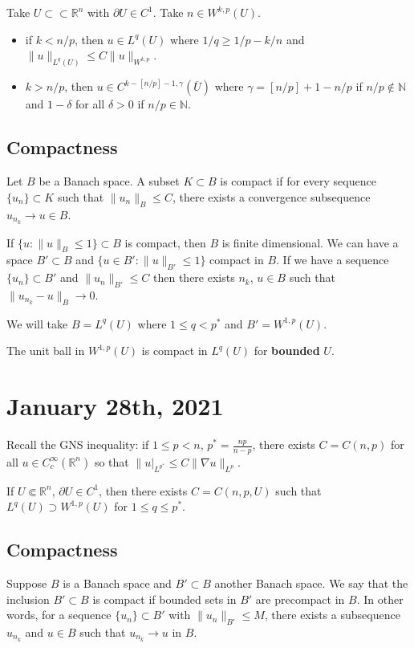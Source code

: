 \documentclass[12pt]{scrartcl}
\newcommand{\N}{\mathbb{N}}
\newcommand{\R}{\mathbb{R}}
\newcommand{\<}{\langle}
\renewcommand{\>}{\rangle}
\let \grad \nabla
\begin{document}
\begin{thm}
Take $U \subset \subset \R^n$ with $\partial U \in C^1$.  Take $n \in W^{k, p}(U)$.  
\begin{itemize}
\item if $k < n/p$, then $u \in L^q(U)$ where $1/q \ge 1/p - k/n$ and $\|u\|_{L^q(U)} \le C \|u\|_{W^{k, p}}$.
\item $k > n/p$, then $u \in C^{k - [n/p] - 1, \gamma}(\overline{U})$ where $\gamma = [n/p] + 1 - n/p$ if $n/p \not \in \N$ and $1 - \delta$ for all $\delta > 0$ if $n/p \in \N$.
\end{itemize}
\end{thm}
\subsection{Compactness}
\begin{definition} Let $B$ be a Banach space.  A subset $K \subset B$ is compact if for every sequence $\{u_n\} \subset K$ such that $\|u_n\|_B \le C$, there exists a convergence subsequence $u_{n_k} \to u \in B$.
\end{definition}
\begin{remark} If $\{u : \|u\|_B \le 1\} \subset B$ is compact, then $B$ is finite dimensional.   We can have a space $B' \subset B$ and $\{u \in B' : \|u\|_{B'} \le 1\}$ compact in $B$.  If we have a sequence $\{u_n\} \subset B'$ and $\|u_n\|_{B'} \le C$ then there exists $n_k$, $u \in B$ such that $\|u_{n_k} -u\|_B \to 0$.
\end{remark}

We will take $B = L^q(U)$ where $1 \le q < p^*$ and $B' = W^{1, p}(U)$.
\begin{thm} The unit ball in $W^{1, p}(U)$ is compact in $L^q(U)$ for \textbf{bounded} $U$.
\end{thm}
\pagebreak
\section{January 28th, 2021}
Recall the GNS inequality: if $1 \le p < n$, $p^* = \frac{np}{n-p}$, there exists $C = C(n, p)$ for all $u \in C_c^{\infty}(\R^n)$ so that $\|u|_{L^{p^*}} \le C \|\grad u\|_{L^p}$.

If $U \Subset \R^n$, $\partial U \in C^1$, then there exists $C= C(n, p, U)$ such that $L^{q}(U) \supset W^{1, p}(U)$ for $1 \le q \le p^*$.
\subsection{Compactness}
Suppose $B$ is a Banach space and $B' \subset B$ another Banach space.  We say that the inclusion $B' \subset B$ is compact if bounded sets in $B'$ are precompact in $B$.  In other words, for a sequence $\{u_n\} \subset B'$ with $\|u_n\|_{B'} \le M$, there exists a subsequence $u_{n_k}$ and $u \in B$ such that $u_{n_k} \to u$ in $B$.
\end{document}
